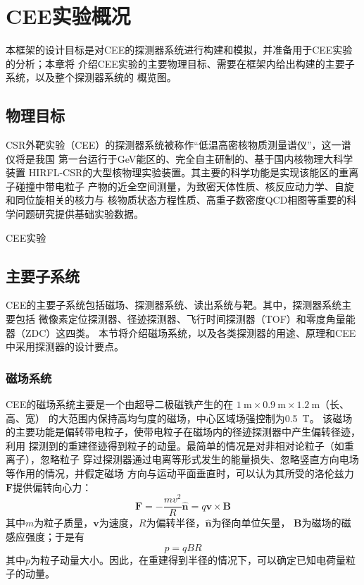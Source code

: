 \documentclass[bachelor,openany,oneside,color]{buaathesis}
\begin{document}
\chapter{CEE实验概况}

本框架的设计目标是对CEE的探测器系统进行构建和模拟，并准备用于CEE实验的分析；本章将
介绍CEE实验的主要物理目标、需要在框架内给出构建的主要子系统，以及整个探测器系统的
概览图。

\section{物理目标}

CSR外靶实验（CEE）的探测器系统被称作“低温高密核物质测量谱仪”，这一谱仪将是我国
第一台运行于\si{\giga\eV}能区的、完全自主研制的、基于国内核物理大科学装置
HIRFL-CSR的大型核物理实验装置。其主要的科学功能是实现该能区的重离子碰撞中带电粒子
产物的近全空间测量，为致密天体性质、核反应动力学、自旋和同位旋相关的核力与
核物质状态方程性质、高重子数密度QCD相图等重要的科学问题研究提供基础实验数据。
\cite{技术文档}

CEE实验

\section{主要子系统}

CEE的主要子系统包括磁场、探测器系统、读出系统与靶。其中，探测器系统主要包括
微像素定位探测器、径迹探测器、飞行时间探测器（TOF）和零度角量能器（ZDC）这四类。
本节将介绍磁场系统，以及各类探测器的用途、原理和CEE中采用探测器的设计要点。

\subsection{磁场系统}

CEE的磁场系统主要是一个由超导二极磁铁产生的在
$\SI{1}{\meter}\times\SI{0.9}{\meter}\times\SI{1.2}{\meter}$（长、高、宽）
的大范围内保持高均匀度的磁场，中心区域场强控制为\SI{0.5}{\tesla}。
该磁场的主要功能是偏转带电粒子，使带电粒子在磁场内的径迹探测器中产生偏转径迹，利用
探测到的重建径迹得到粒子的动量。最简单的情况是对非相对论粒子（如重离子），忽略粒子
穿过探测器通过电离等形式发生的能量损失、忽略竖直方向电场等作用的情况，并假定磁场
方向与运动平面垂直时，可以认为其所受的洛伦兹力$\bm{F}$提供偏转向心力：
\begin{equation}
\bm{F} = -\frac{mv^2}{R}\hat{\bm{n}} = q\bm{v}\times\bm{B}
\end{equation}
其中$m$为粒子质量，$\bm{v}$为速度，$R$为偏转半径，$\hat{\bm{n}}$为径向单位矢量，
$\bm{B}$为磁场的磁感应强度；于是有
\begin{equation}
p = q B R
\end{equation}
其中$p$为粒子动量大小。因此，在重建得到半径的情况下，可以确定已知电荷量粒子的动量。
\end{document}

